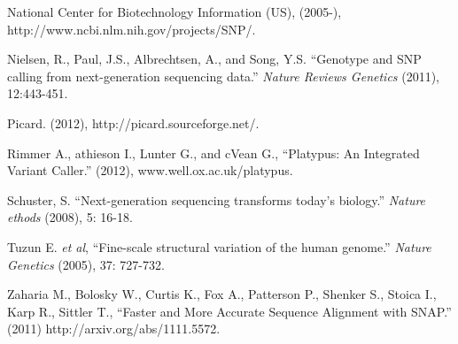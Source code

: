 \documentclass[10pt]{article}
\begin{document}
\begin{thebibliography}{1}
 National Center for Biotechnology Information (US), (2005-), http://www.ncbi.nlm.nih.gov/projects/SNP/.

 Nielsen, R., Paul, J.S., Albrechtsen, A., and Song, Y.S. ``Genotype and SNP calling from next-generation sequencing data.'' {\em Nature Reviews Genetics} (2011), 12:443-451. 

 Picard. (2012), http://picard.sourceforge.net/.

 Rimmer A., athieson I., Lunter G., and cVean G., ``Platypus: An Integrated Variant Caller.'' (2012), www.well.ox.ac.uk/platypus.

 Schuster, S. ``Next-generation sequencing transforms today's biology.'' {\em Nature ethods} (2008), 5: 16-18.

 Tuzun E. {\em et al}, ``Fine-scale structural variation of the human genome.'' {\em Nature Genetics} (2005), 37: 727-732. 

 Zaharia M., Bolosky W., Curtis K., Fox A., Patterson P., Shenker S., Stoica I., Karp R., Sittler T., ``Faster and More Accurate Sequence Alignment with SNAP.'' (2011) http://arxiv.org/abs/1111.5572.

\end{thebibliography}
\end{document}
